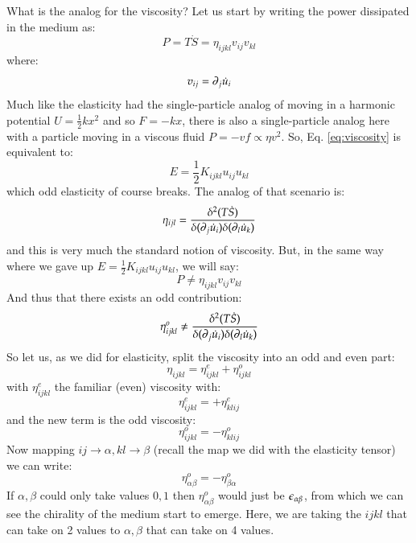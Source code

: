 What is the analog for the viscosity? Let us start by writing the power dissipated in the medium as:
\begin{equation}\label{eq:viscosity}
    P = T\dot{S} = \eta_{ijkl}v_{ij}v_{kl}
\end{equation}
where:
\begin{equation}
    v_{ij} = \partial_j \dot{u}_i
\end{equation}
Much like the elasticity had the single-particle analog of moving in a harmonic potential $U = \frac{1}{2}kx^2$ and so $F = -kx$, there is also a single-particle analog here with a particle moving in a viscous fluid $P = -vf \propto \eta v^2$. So, Eq. \eqref{eq:viscosity} is equivalent to:
\begin{equation}
    E = \frac{1}{2}K_{ijkl}u_{ij}u_{kl}
\end{equation}
which odd elasticity of course breaks. The analog of that scenario is:
\begin{equation}
    \eta_{ijl} = \frac{\delta^2(T\dot{S})}{\delta(\partial_j \dot{u}_i)\delta(\partial_l \dot{u}_k)}
\end{equation}
and this is very much the standard notion of viscosity. But, in the same way where we gave up $E = \frac{1}{2}K_{ijkl}u_{ij}u_{kl}$, we will say:
\begin{equation}
    P \neq \eta_{ijkl}v_{ij}v_{kl}
\end{equation}
And thus that there exists an odd contribution:
\begin{equation}
    \eta^o_{ijkl} \neq \frac{\delta^2(T\dot{S})}{\delta(\partial_j \dot{u}_i)\delta(\partial_l \dot{u}_k)}
\end{equation}
So let us, as we did for elasticity, split the viscosity into an odd and even part:
\begin{equation}
    \eta_{ijkl} = \eta^e_{ijkl} + \eta^o_{ijkl}
\end{equation}
with $\eta^e_{ijkl}$ the familiar (even) viscosity with:
\begin{equation}
    \eta^{e}_{ijkl} = +\eta^{e}_{klij}
\end{equation}
and the new term is the odd viscosity:
\begin{equation}
    \boxed{\eta^o_{ijkl} = -\eta^o_{klij}}
\end{equation}
Now mapping $ij \to \alpha, kl \to \beta$ (recall the map we did with the elasticity tensor) we can write:
\begin{equation}
    \eta^o_{\alpha\beta} = -\eta^o_{\beta\alpha}
\end{equation}
If $\alpha, \beta$ could only take values $0, 1$ then $\eta^o_{\alpha\beta}$ would just be $\epsilon_{\alpha\beta}$, from which we can see the chirality of the medium start to emerge. Here, we are taking the $ijkl$ that can take on 2 values to $\alpha, \beta$ that can take on 4 values.

